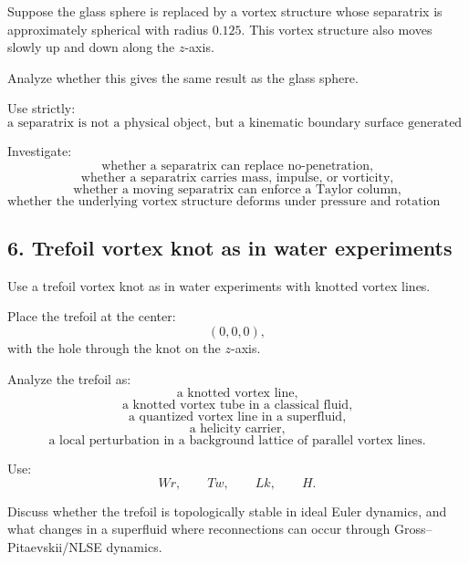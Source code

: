 \documentclass[11pt]{article}
\begin{document}
            Suppose the glass sphere is replaced by a vortex structure whose separatrix is approximately spherical with radius \(0.125\). This vortex structure also moves slowly up and down along the \(z\)-axis.
            
            Analyze whether this gives the same result as the glass sphere.
            
            Use strictly:
            \[
                \text{a separatrix is not a physical object, but a kinematic boundary surface generated by the flow.}
            \]
            
            Investigate:
            \[
                \text{whether a separatrix can replace no-penetration,}
            \]
            \[
                \text{whether a separatrix carries mass, impulse, or vorticity,}
            \]
            \[
                \text{whether a moving separatrix can enforce a Taylor column,}
            \]
            \[
                \text{whether the underlying vortex structure deforms under pressure and rotation effects.}
            \]
        
        \subsection{6. Trefoil vortex knot as in water experiments}
            
            Use a trefoil vortex knot as in water experiments with knotted vortex lines.
            
            Place the trefoil at the center:
            \[
                (0,0,0),
            \]
            with the hole through the knot on the \(z\)-axis.
            
            Analyze the trefoil as:
            \[
                \text{a knotted vortex line,}
            \]
            \[
                \text{a knotted vortex tube in a classical fluid,}
            \]
            \[
                \text{a quantized vortex line in a superfluid,}
            \]
            \[
                \text{a helicity carrier,}
            \]
            \[
                \text{a local perturbation in a background lattice of parallel vortex lines.}
            \]
            
            Use:
            \[
                Wr,
                \qquad
                Tw,
                \qquad
                Lk,
                \qquad
                H.
            \]
            
            Discuss whether the trefoil is topologically stable in ideal Euler dynamics, and what changes in a superfluid where reconnections can occur through Gross--Pitaevskii/NLSE dynamics.
        
\end{document}
